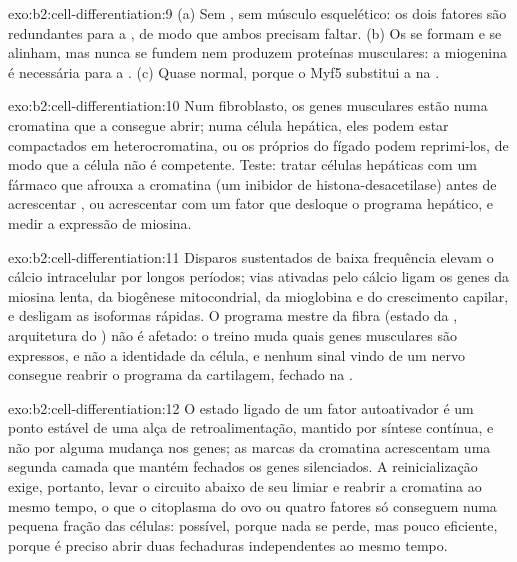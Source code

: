 \begin{solution}{exo:b2:cell-differentiation:9}
(a) Sem , sem músculo esquelético: os dois fatores são
redundantes para a , de modo que ambos precisam faltar. (b)
Os  se formam e se alinham, mas nunca se fundem nem produzem
proteínas musculares: a miogenina é necessária para a .
(c) Quase normal, porque o Myf5 substitui a  na .
\end{solution}

\begin{solution}{exo:b2:cell-differentiation:10}
Num fibroblasto, os genes musculares estão numa cromatina que a 
consegue abrir; numa célula hepática, eles podem estar compactados em
heterocromatina, ou os próprios  do fígado podem
reprimi-los, de modo que a célula não é competente. Teste: tratar
células hepáticas com um fármaco que afrouxa a cromatina (um inibidor
de histona-desacetilase) antes de acrescentar , ou acrescentar 
com um fator que desloque o programa hepático, e medir a expressão de
miosina.
\end{solution}

\begin{solution}{exo:b2:cell-differentiation:11}
Disparos sustentados de baixa frequência elevam o cálcio intracelular
por longos períodos; vias ativadas pelo cálcio ligam os genes da
miosina lenta, da biogênese mitocondrial, da mioglobina e do
crescimento capilar, e desligam as isoformas rápidas. O programa mestre
da fibra (estado da , arquitetura do ) não é afetado: o
treino muda quais genes musculares são expressos, e não a identidade
da célula, e nenhum sinal vindo de um nervo consegue reabrir o
programa da cartilagem, fechado na .
\end{solution}

\begin{solution}{exo:b2:cell-differentiation:12}
O estado ligado de um fator autoativador é um ponto estável de uma
alça de retroalimentação, mantido por síntese contínua, e não por
alguma mudança nos genes; as marcas da cromatina acrescentam uma
segunda camada que mantém fechados os genes silenciados. A
reinicialização exige, portanto, levar o circuito abaixo de seu limiar
e reabrir a cromatina ao mesmo tempo, o que o citoplasma do ovo ou
quatro fatores só conseguem numa pequena fração das células: possível,
porque nada se perde, mas pouco eficiente, porque é preciso abrir duas
fechaduras independentes ao mesmo tempo.
\end{solution}

